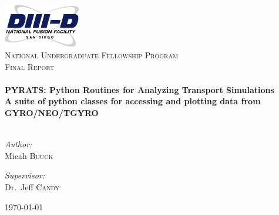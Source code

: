 \begin{titlepage}

\begin{center}


\includegraphics[width=0.25\textwidth]{d3d_logo.png}\\[1cm]


\textsc{\large National Undergraduate Fellowship Program}\\[1.5cm]

\textsc{\normalsize Final Report}\\[0.5cm]

\HRule \\[0.4cm]
{ \Large \bfseries PYRATS: Python Routines for Analyzing Transport Simulations}\\[0.3cm]
{ \normalsize \bfseries A suite of python classes for accessing and plotting data from GYRO/NEO/TGYRO}\\[0.4cm]

\HRule \\[1.5cm]

\begin{minipage}
{0.4\textwidth}
\begin{flushleft} \large\emph{Author:}\\
Micah \textsc{Buuck}
\end{flushleft}
\end{minipage}
\begin{minipage}
{0.4\textwidth}
\begin{flushright} \large
\emph{Supervisor:} \\
Dr.~Jeff \textsc{Candy}
\end{flushright}
\end{minipage}

\vfill

{\large \today}

\end{center}
\end{titlepage}
